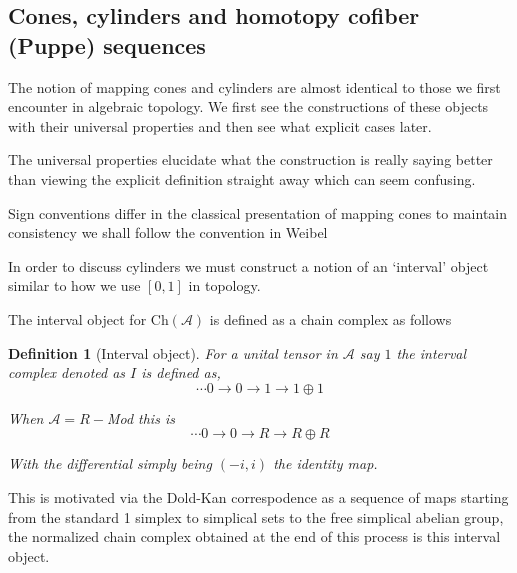 \documentclass[12pt]{report}
\numberwithin{equation}{section}
\newtheorem{definition}[dummy]{Definition}
\begin{document}
	
	
	\subsection{Cones, cylinders and homotopy cofiber (Puppe) sequences}
	
	
	The notion of mapping cones and cylinders are almost identical to those we first encounter in algebraic topology. We first see the constructions of these objects with their universal properties and then see what explicit cases later.
	
	The universal properties elucidate what the construction is really saying better than viewing the explicit definition straight away which can seem confusing.
	
	Sign conventions differ in the classical presentation of mapping cones to maintain consistency we shall follow the convention in Weibel \cite{weibel_1994}
	
	In order to discuss cylinders we must construct a notion of an `interval' object similar to how we use $[0,1]$ in topology.
	
	
	The interval object for $\mathrm{Ch}(\mathcal{A})$ is defined as a chain complex as follows
	\begin{definition}[Interval object]
		For a unital tensor in $\mathcal{A}$ say $1$ the interval complex denoted as $I$ is defined as,
		\[ \cdots 0 \to 0 \to 1 \to 1 \oplus 1 \]
		
		When $\mathcal{A}=R-$Mod this is 
		\[ \cdots 0 \to 0 \to R \to R \oplus R \]
		
		With the differential simply being $(-i,i)$ the identity map.
	\end{definition}
	
	This is motivated via the Dold-Kan correspodence as a sequence of maps starting from the standard 1 simplex to simplical sets to the free simplical abelian group, the normalized chain complex obtained at the end of this process is this interval object.
	
\end{document}

